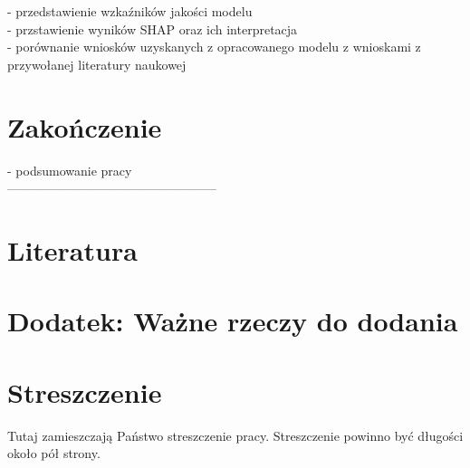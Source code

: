 \documentclass[polish, twoside, 12pt, a4paper]{article}
\theoremstyle{definition}
\theoremstyle{plain}
\theoremstyle{remark}
\begin{document}
- przedstawienie wzkaźników jakości modelu \\
- przstawienie wyników SHAP oraz ich interpretacja \\
- porównanie wniosków uzyskanych z opracowanego modelu z wnioskami z przywołanej literatury naukowej \\ 

\clearpage
\section{Zakończenie}


- podsumowanie pracy \\


--------------------------------------------------
\clearpage
\section{Literatura}



\appendix

\clearpage
\section{Dodatek: Ważne rzeczy do dodania}




\clearpage



\clearpage
{}
\listoftables

\clearpage
{}
\listoffigures



\clearpage
{}
\section*{Streszczenie}

Tutaj zamieszczają Państwo streszczenie pracy. Streszczenie powinno być długości około pół strony.
\end{document}
